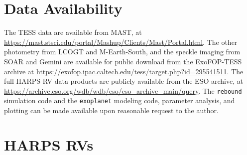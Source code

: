 \documentclass[fleqn,usenatbib,useAMS]{mnras}
\begin{document}
\section{Data Availability}

The TESS data are available from MAST, at \url{https://mast.stsci.edu/portal/Mashup/Clients/Mast/Portal.html}. The other photometry from LCOGT and M-Earth-South, and the speckle imaging from SOAR and Gemini are available for public download from the ExoFOP-TESS archive at \url{https://exofop.ipac.caltech.edu/tess/target.php?id=295541511}. The full HARPS RV data products are publicly available from the ESO archive, at \url{https://archive.eso.org/wdb/wdb/eso/eso_archive_main/query}. The \texttt{rebound} simulation code and the \texttt{exoplanet} modeling code, parameter analysis, and plotting can be made available upon reasonable request to the author.




\appendix

\section{HARPS RVs}
\end{document}
